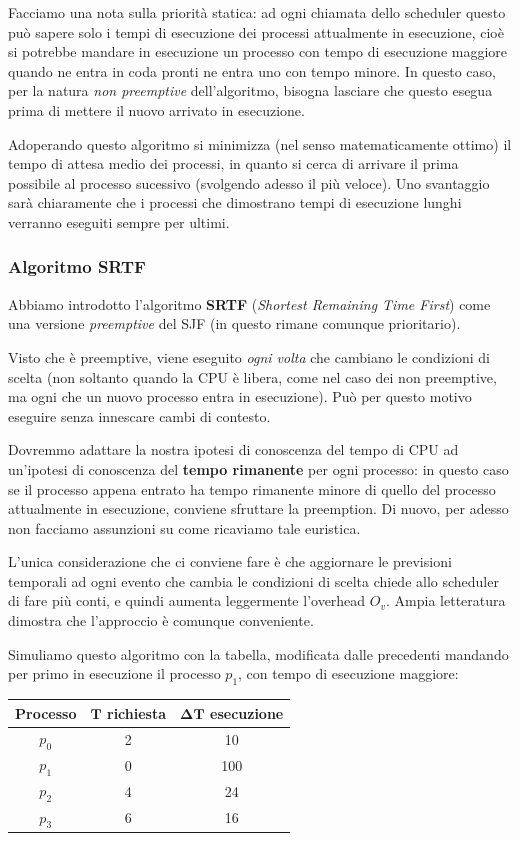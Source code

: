 \documentclass[a4paper,11pt]{article}
\begin{document}
\par\smallskip

Facciamo una nota sulla priorità statica: ad ogni chiamata dello scheduler questo può sapere solo i tempi di esecuzione dei processi attualmente in esecuzione, cioè si potrebbe mandare in esecuzione un processo con tempo di esecuzione maggiore quando ne entra in coda pronti ne entra uno con tempo minore. 
In questo caso, per la natura \textit{non preemptive} dell'algoritmo, bisogna lasciare che questo esegua prima di mettere il nuovo arrivato in esecuzione.

Adoperando questo algoritmo si minimizza (nel senso matematicamente ottimo) il tempo di attesa medio dei processi, in quanto si cerca di arrivare il prima possibile al processo sucessivo (svolgendo adesso il più veloce).
Uno svantaggio sarà chiaramente che i processi che dimostrano tempi di esecuzione lunghi verranno eseguiti sempre per ultimi.

\subsubsection{Algoritmo SRTF}
Abbiamo introdotto l'algoritmo \textbf{SRTF} (\textit{Shortest Remaining Time First}) come una versione \textit{preemptive} del SJF (in questo rimane comunque prioritario).

Visto che è preemptive, viene eseguito \textit{ogni volta} che cambiano le condizioni di scelta (non soltanto quando la CPU è libera, come nel caso dei non preemptive, ma ogni che un nuovo processo entra in esecuzione).
Può per questo motivo eseguire senza innescare cambi di contesto.

Dovremmo adattare la nostra ipotesi di conoscenza del tempo di CPU ad un'ipotesi di conoscenza del \textbf{tempo rimanente} per ogni processo: in questo caso se il processo appena entrato ha tempo rimanente minore di quello del processo attualmente in esecuzione, conviene sfruttare la preemption.
Di nuovo, per adesso non facciamo assunzioni su come ricaviamo tale euristica.

L'unica considerazione che ci conviene fare è che aggiornare le previsioni temporali ad ogni evento che cambia le condizioni di scelta chiede allo scheduler di fare più conti, e quindi aumenta leggermente l'overhead $O_v$.
Ampia letteratura dimostra che l'approccio è comunque conveniente. 

\par\smallskip

Simuliamo questo algoritmo con la tabella, modificata dalle precedenti mandando per primo in esecuzione il processo $p_1$, con tempo di esecuzione maggiore:
\begin{table}[H]
	\center {}
	\begin{tabular} { c || c | c }
		\bfseries Processo & \bfseries $\mathbf{T}$ richiesta & \bfseries $\mathbf{\Delta T}$ esecuzione \\
		\hline
		$p_0$ & 2 & 10 \\ 
		$p_1$ & 0 & 100 \\ 
		$p_2$ & 4 & 24 \\ 
		$p_3$ & 6 & 16 
	\end{tabular}
\end{table}
\end{document}
